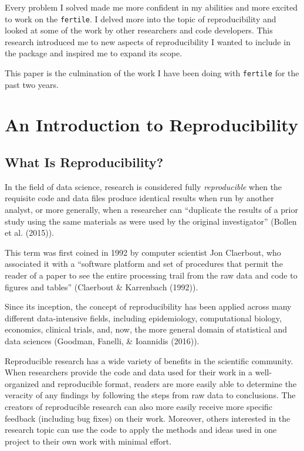 \documentclass[12pt,twoside]{reedthesis}
\begin{document}
Every problem I solved made me more confident in my abilities and more excited to work on the \texttt{fertile}. I delved more into the topic of reproducibility and looked at some of the work by other researchers and code developers. This research introduced me to new aspects of reproducibility I wanted to include in the package and inspired me to expand its scope.

This paper is the culmination of the work I have been doing with \texttt{fertile} for the past two years.

\hypertarget{reproducibility}{%
\chapter{An Introduction to Reproducibility}\label{reproducibility}}

\hypertarget{what-is-reproducibility}{%
\section{What Is Reproducibility?}\label{what-is-reproducibility}}

In the field of data science, research is considered fully \emph{reproducible} when the requisite code and data files produce identical results when run by another analyst, or more generally, when a researcher can ``duplicate the results of a prior study using the same materials as were used by the original investigator'' (Bollen et al. (2015)).

This term was first coined in 1992 by computer scientist Jon Claerbout, who associated it with a ``software platform and set of procedures that permit the reader of a paper to see the entire processing trail from the raw data and code to figures and tables'' (Claerbout \& Karrenbach (1992)).

Since its inception, the concept of reproducibility has been applied across many different data-intensive fields, including epidemiology, computational biology, economics, clinical trials, and, now, the more general domain of statistical and data sciences (Goodman, Fanelli, \& Ioannidis (2016)).

Reproducible research has a wide variety of benefits in the scientific community. When researchers provide the code and data used for their work in a well-organized and reproducible format, readers are more easily able to determine the veracity of any findings by following the steps from raw data to conclusions. The creators of reproducible research can also more easily receive more specific feedback (including bug fixes) on their work. Moreover, others interested in the research topic can use the code to apply the methods and ideas used in one project to their own work with minimal effort.
\end{document}
